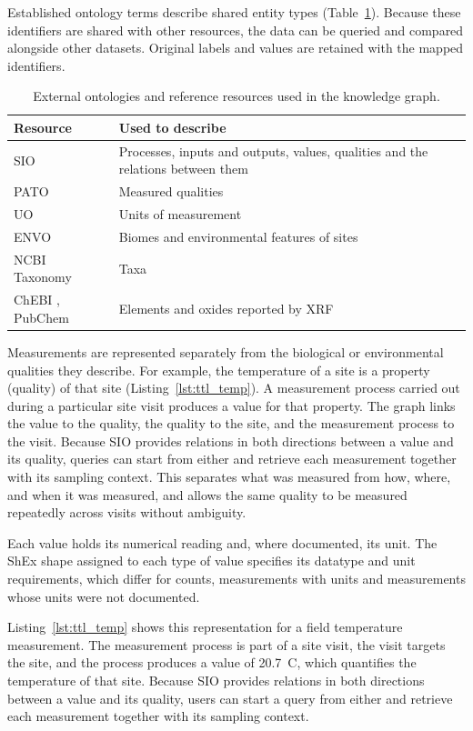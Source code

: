 \begin{revision}
Established ontology terms describe shared entity types (Table~\ref{tab:external_resources}). Because these identifiers are shared with other resources, the data can be queried and compared alongside other datasets. Original labels and values are retained with the mapped identifiers.

\begin{table}[h]
\centering
\caption{External ontologies and reference resources used in the
knowledge graph.}
\label{tab:external_resources}
\small
\begin{tabular}{p{}p{}}
\toprule
Resource & Used to describe \\
\midrule
SIO \cite{sio} & Processes, inputs and outputs, values, qualities and
  the relations between them \\
PATO & Measured qualities \\
UO \cite{uo}& Units of measurement \\
ENVO \cite{envo} & Biomes and environmental features of sites \\
NCBI Taxonomy \cite{ncbitaxon} & Taxa\\
ChEBI \cite{chebi}, PubChem \cite{pubchem} & Elements and oxides reported
  by XRF \\
\bottomrule
\end{tabular}
\end{table}

Measurements are represented separately from the biological or environmental qualities they describe. For example, the temperature of a site is a property (quality) of that site (Listing~\ref{lst:ttl_temp}). A measurement process carried out during a particular site visit produces a value for that property. The graph links the value to the quality, the quality to the site, and the measurement process to the visit. Because SIO provides relations in both directions between a value and its quality, queries can start from either and retrieve each measurement together with its sampling context. This separates what was measured from how, where, and when it was measured, and allows the same quality to be measured repeatedly across visits without ambiguity.

Each value holds its numerical reading and, where documented, its unit. The ShEx shape assigned to each type of value specifies its datatype and unit requirements, which differ for counts, measurements with units and measurements whose units were not documented.

Listing~\ref{lst:ttl_temp} shows this representation for a field temperature measurement. The measurement process is part of a site visit, the visit targets the site, and the process produces a value of 20.7~\degree C, which quantifies the temperature of that site. Because SIO provides relations in both directions between a value and its quality, users can start a query from either and retrieve each measurement together with its sampling context.


\end{revision}
